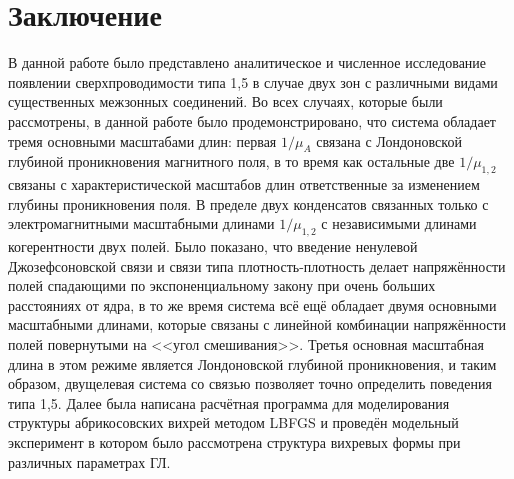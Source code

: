 \chapter*{Заключение}

В данной работе было представлено аналитическое и численное исследование 
появлении сверхпроводимости типа 1,5 в случае двух зон с различными видами 
существенных межзонных соединений. Во всех случаях, которые были рассмотрены, в 
данной работе было продемонстрировано, что система обладает тремя основными 
масштабами длин: первая \( 1/\mu_A \) связана с Лондоновской глубиной 
проникновения магнитного поля, в то время как остальные две \( 1/\mu_{1,2} \) 
связаны с характеристической масштабов длин ответственные за изменением 
глубины проникновения поля. В пределе двух конденсатов связанных только с 
электромагнитными масштабными длинами \( 1/\mu_{1,2} \) с независимыми  
длинами когерентности двух полей. Было показано, что введение ненулевой 
Джозефсоновской связи и связи типа плотность-плотность делает напряжённости 
полей спадающими по экспоненциальному закону при очень больших расстояниях от 
ядра, в то же время система всё ещё обладает двумя основными масштабными 
длинами, которые связаны с линейной комбинации напряжённости полей повернутыми 
на <<угол смешивания>>. Третья основная масштабная длина в этом режиме является 
Лондоновской глубиной проникновения, и таким образом, двущелевая система со 
связью позволяет точно определить поведения типа 1,5. Далее была написана 
расчётная программа для моделирования структуры абрикосовских вихрей методом 
LBFGS и проведён модельный эксперимент в котором было рассмотрена структура 
вихревых формы при различных параметрах ГЛ.

\newpage
